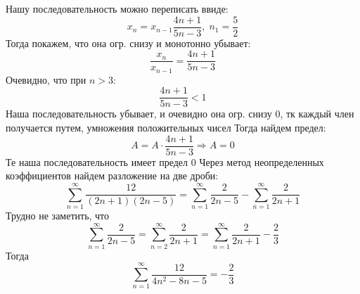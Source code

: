 \documentclass{report}
\begin{document}
\sol
Нашу последовательность можно переписать ввиде:
\begin{equation*}
	x_{n}=x_{n-1}\dfrac{4n+1}{5n-3}, \; n_1=\dfrac{5}{2}
\end{equation*}
Тогда покажем, что она огр. снизу и монотонно убывает:
\begin{equation*}
	\dfrac{x_n}{x_{n-1}}=\dfrac{4n+1}{5n-3}  \end{equation*}
Очевидно, что при $n>3$:
\begin{equation*}
\dfrac{4n+1}{5n-3}<1
\end{equation*}
Наша последовательность убывает, и очевидно она огр. снизу 0, тк каждый член получается путем, умножения положительных чисел
Тогда найдем предел:
\begin{equation*}
	A=A\cdot \dfrac{4n+1}{5n-3} \Rightarrow A=0
\end{equation*}
Те наша последовательность имеет предел 0
\sol
Через метод неопределенных коэффициентов найдем разложение на две дроби:
\[
	\sum_{n=1}^{\infty}\dfrac{12}{(2n+1)(2n-5)}=\sum_{n=1}^{\infty}\dfrac{2}{2n-5}-\sum_{n=1}^{\infty}\dfrac{2}{2n+1}
\]
Трудно не заметить, что \[\sum_{n=1}^{\infty}\dfrac{2}{2n-5}=\sum_{n=2}^{\infty}\dfrac{2}{2n+1}=\sum_{n=1}^{\infty}\dfrac{2}{2n+1}-\dfrac{2}{3} \]
Тогда \[ \sum_{n=1}^{\infty}\dfrac{12}{4n^2-8n-5}=-\dfrac{2}{3}\]

\end{document}

